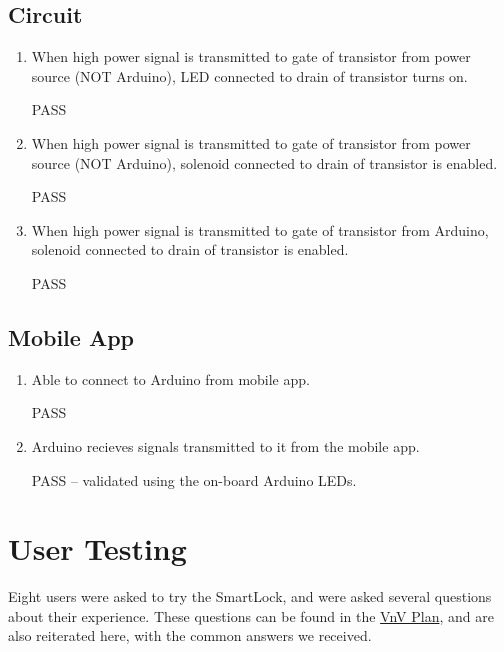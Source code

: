\documentclass[12pt, titlepage]{article}
\begin{document}
\subsection{Circuit}
\begin{enumerate}
    \item When high power signal is transmitted to gate of transistor from power source (NOT Arduino), LED connected to drain of transistor turns on.

    PASS
    \item When high power signal is transmitted to gate of transistor from power source (NOT Arduino), solenoid connected to drain of transistor is enabled.

    PASS
    \item When high power signal is transmitted to gate of transistor from Arduino, solenoid connected to drain of transistor is enabled.

    PASS
\end{enumerate}

\subsection{Mobile App}
\begin{enumerate}
    \item Able to connect to Arduino from mobile app.

    PASS
    \item Arduino recieves signals transmitted to it from the mobile app.

    PASS -- validated using the on-board Arduino LEDs.
\end{enumerate}

\section{User Testing} \label{User Testing}

Eight users were asked to try the SmartLock, and were asked several questions about their experience. These questions can be found in the \href{https://github.com/NevoAbigail/Capstone/blob/main/docs/VnVPlan/VnVPlan.pdf}{VnV Plan}, and are also reiterated here, with the common answers we received.
\end{document}
